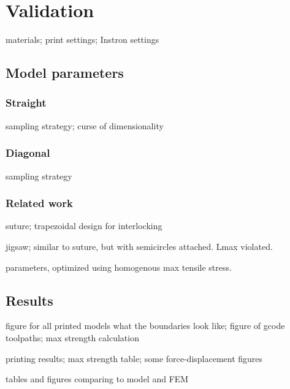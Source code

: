 \section{Validation}
materials; print settings; Instron settings


\subsection{Model parameters}
\subsubsection{Straight}
sampling strategy; curse of dimensionality


\subsubsection{Diagonal}
sampling strategy 


\subsubsection{Related work}
suture; trapezoidal design for interlocking

jigsaw; similar to suture, but with semicircles attached. Lmax violated.

parameters, optimized using homogenous max tensile stress.


\subsection{Results}
figure for all printed models what the boundaries look like;
figure of gcode toolpaths;
max strength calculation

printing results; max strength table; some force-displacement figures

tables and figures comparing to model and FEM